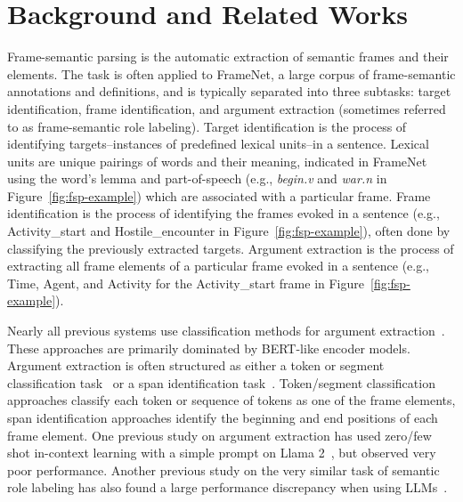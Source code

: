 \section{Background and Related Works}

Frame-semantic parsing is the automatic extraction of semantic frames and their elements. The task is often applied to FrameNet, a large corpus of frame-semantic annotations and definitions, and is typically separated into three subtasks: target identification, frame identification, and argument extraction (sometimes referred to as frame-semantic role labeling). Target identification is the process of identifying targets--instances of predefined lexical units--in a sentence. Lexical units are unique pairings of words and their meaning, indicated in FrameNet using the word's lemma and part-of-speech (e.g., \textit{begin.v} and \textit{war.n} in Figure~\ref{fig:fsp-example}) which are associated with a particular frame. Frame identification is the process of identifying the frames evoked in a sentence (e.g., Activity\_start and Hostile\_encounter in Figure~\ref{fig:fsp-example}), often done by classifying the previously extracted targets. Argument extraction is the process of extracting all frame elements of a particular frame evoked in a sentence (e.g., Time, Agent, and Activity for the Activity\_start frame in Figure~\ref{fig:fsp-example}). 

Nearly all previous systems use classification methods for argument extraction~\cite{chakma2024semantic}. These approaches are primarily dominated by BERT-like encoder models. Argument extraction is often structured as either a token or segment classification task~\cite{Su2024, aged2023, zheng-etal-2022-double, Bastianelli2020EncodingSC, opensesame, lin-etal-2021-graph} or a span identification task~\cite{Ai_Tu_2024, devasier-etal-2024-claimlens, aged2023, chen-etal-2021-joint}. Token/segment classification approaches classify each token or sequence of tokens as one of the frame elements, span identification approaches identify the beginning and end positions of each frame element. One previous study on argument extraction has used zero/few shot in-context learning with a simple prompt on Llama 2~\cite{Su2024}, but observed very poor performance. Another previous study on the very similar task of semantic role labeling has also found a large performance discrepancy when using LLMs~\cite{limitations-of-llms-ning-2024}.
